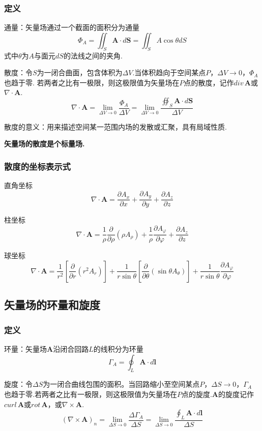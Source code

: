 \documentclass[12pt, UTF8, AutoFakeBold]{ctexart} %
\begin{document}
\subsubsection{定义}
通量：矢量场通过一个截面的面积分为通量
\[
    \varPhi_A = \iint_{S} \boldsymbol{A} \cdot d\boldsymbol{S} = \iint_S A\cos\theta dS
\]
式中$\theta$为$A$与面元$dS$的法线之间的夹角.

散度：令$S$为一闭合曲面，包含体积为$\Delta V$.当体积趋向于空间某点$P$，$\Delta V \to 0$，$\varPhi_A$也趋于零.
若两者之比有一极限，则这极限值为矢量场在$P$点的散度，记作$div \, \boldsymbol{A}$或$\nabla \cdot \boldsymbol{A}$.
\[
    \nabla \cdot \boldsymbol{A} = \lim_{\Delta V \to 0}\frac{\varPhi_A}{\Delta V} = 
    \lim_{\Delta V \to 0}\frac{\oiint_S\boldsymbol{A} \cdot d\boldsymbol{S}}{\Delta V}
\]

散度的意义：用来描述空间某一范围内场的发散或汇聚，具有局域性质.

\textbf{矢量场的散度是个标量场.}
\subsubsection{散度的坐标表示式}
直角坐标
\[
    \nabla \cdot \boldsymbol{A} = \frac{\partial A_x}{\partial x}
    + \frac{\partial A_y}{\partial y}
    + \frac{\partial A_z}{\partial z}
\]

柱坐标
\[
    \nabla \cdot \boldsymbol{A} = \frac{1}{\rho}\frac{\partial}{\partial\rho}(\rho A_\rho)
    + \frac{1}{\rho}\frac{\partial A_\varphi}{\partial\varphi}
    + \frac{\partial A_z}{\partial z}
\]

球坐标
\[
    \nabla \cdot \boldsymbol{A} =
    \frac{1}{r^2}\left[\frac{\partial}{\partial r}(r^2 A_r)\right]
    + \frac{1}{r\sin\theta}\left[\frac{\partial}{\partial\theta}(\sin\theta A_\theta)\right]
    + \frac{1}{r\sin\theta}\frac{\partial A_\varphi}{\partial\varphi}
\]

\subsection{矢量场的环量和旋度}
\subsubsection{定义}
环量：矢量场$\boldsymbol{A}$沿闭合回路$L$的线积分为环量
\[
    \varGamma_A = \oint_L\boldsymbol{A} \cdot d\boldsymbol{l}
\]

旋度：令$\Delta S$为一闭合曲线包围的面积。当回路缩小至空间某点$P$，$\Delta S \to 0$，$\varGamma_A$
也趋于零.若两者之比有一极限，则这极限值为矢量场在$P$点的旋度.$\boldsymbol{A}$的旋度记作
$curl \, \boldsymbol{A}$或$rot \, \boldsymbol{A}$，或$\nabla \times \boldsymbol{A}$.
\[
    (\nabla \times \boldsymbol{A})_n = \lim_{\Delta S \to 0}\frac{\Delta\varGamma_A}{\Delta S}
    = \lim_{\Delta S \to 0}\frac{\oint_L\boldsymbol{A} \cdot d\boldsymbol{l}}{\Delta S}
\]
\end{document}

